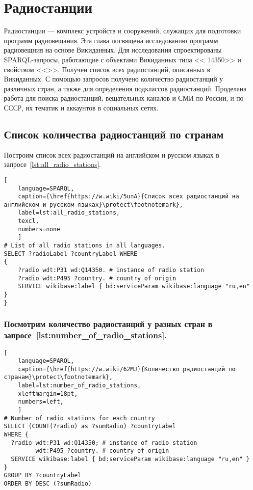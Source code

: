 \chapter[Радиостанции]{Радиостанции}
\label{ch:radio-station}

Радиостанции --- комплекс устройств и сооружений, служащих для подготовки программ радиовещания. Эта глава посвящена исследованию программ радиовещния на основе Викиданных. Для исследования спроектированы SPARQL-запросы, работающие с объектами Викиданных типа << {14350}>> и свойством <<>>. Получен список всех радиостанций, описанных в Викиданных. С помощью запросов получено количество радиостанций у различных стран, а также для определения подклассов радиостанций. Проделана работа для поиска радиостанций, вещательных каналов и СМИ по России, и по СССР, их тематик и аккаунтов в социальных сетях.

\section{Список количества радиостанций по странам}

Построим список всех радиостанций на английском и русском языках в запросе~\ref{lst:all_radio_stations}.
\begin{lstlisting}[ 
    language=SPARQL,
    caption={\href{https://w.wiki/5unA}{Cписок всех радиостанций на английском и русском языках}\protect\footnotemark},
    label=lst:all_radio_stations,
    texcl,
    numbers=none
    ]
# List of all radio stations in all languages.
SELECT ?radioLabel ?countryLabel WHERE
{
    ?radio wdt:P31 wd:Q14350. # instance of radio station
    ?radio wdt:P495 ?country. # country of origin
    SERVICE wikibase:label { bd:serviceParam wikibase:language "ru,en" }
}
\end{lstlisting}%

\newpage

\subsection{Посмотрим количество радиостанций у разных стран в запросе~\ref{lst:number_of_radio_stations}. }

\begin{lstlisting}[ 
    language=SPARQL,
    caption={\href{https://w.wiki/62MJ}{Количество радиостанций по странам}\protect\footnotemark},
    label=lst:number_of_radio_stations,
    xleftmargin=18pt,
    numbers=left,
    ]
# Number of radio stations for each country
SELECT (COUNT(?radio) as ?sumRadio) ?countryLabel
WHERE {
  ?radio wdt:P31 wd:Q14350; # instance of radio station
         wdt:P495 ?country. # country of origin
  SERVICE wikibase:label { bd:serviceParam wikibase:language "ru,en" }
}
GROUP BY ?countryLabel
ORDER BY DESC (?sumRadio)
\end{lstlisting}%

